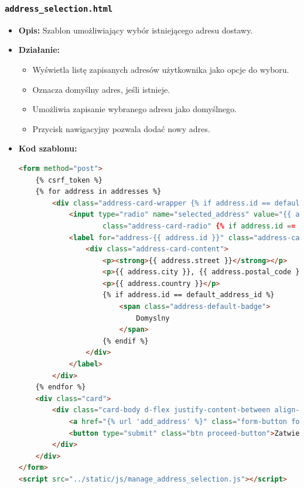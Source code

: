 \documentclass[12pt,a4paper,oneside]{article}
\theoremstyle{definition}
\numberwithin{equation}{section}
\begin{document}
\subsubsection*{\texttt{address\_selection.html}}
\label{sec:address_selection_template}
\begin{itemize}
    \item \textbf{Opis:} Szablon umożliwiający wybór istniejącego adresu dostawy.
    \item \textbf{Działanie:}
        \begin{itemize}
            \item Wyświetla listę zapisanych adresów użytkownika jako opcje do wyboru.
            \item Oznacza domyślny adres, jeśli istnieje.
            \item Umożliwia zapisanie wybranego adresu jako domyślnego.
            \item Przycisk nawigacyjny pozwala dodać nowy adres.
        \end{itemize}
    \item \textbf{Kod szablonu:}
\begin{lstlisting}[language=HTML, caption=Szablon \texttt{address\_selection.html}]
<form method="post">
    {% csrf_token %}
    {% for address in addresses %}
        <div class="address-card-wrapper {% if address.id == default_address_id %}address-default{% endif %}">
            <input type="radio" name="selected_address" value="{{ address.id }}" id="address-{{ address.id }}"
                    class="address-card-radio" {% if address.id == default_address_id %}checked{% endif %}>
            <label for="address-{{ address.id }}" class="address-card-label">
                <div class="address-card-content">
                    <p><strong>{{ address.street }}</strong></p>
                    <p>{{ address.city }}, {{ address.postal_code }}</p>
                    <p>{{ address.country }}</p>
                    {% if address.id == default_address_id %}
                        <span class="address-default-badge">
                            Domyslny
                        </span>
                    {% endif %}
                </div>
            </label>
        </div>
    {% endfor %}
    <div class="card">
        <div class="card-body d-flex justify-content-between align-items-center">
            <a href="{% url 'add_address' %}" class="form-button form-button-secondary">Dodaj nowy adres</a>
            <button type="submit" class="btn proceed-button">Zatwierdz adres</button>
        </div>
    </div>
</form>
<script src="../static/js/manage_address_selection.js"></script>
\end{lstlisting}
\end{itemize}
\end{document}
